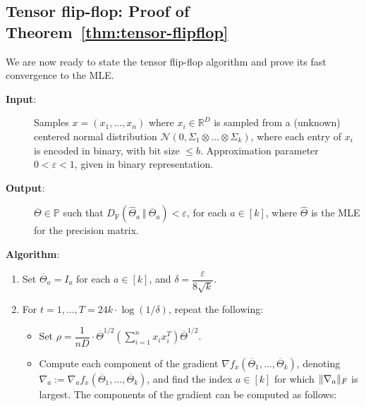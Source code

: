 \documentclass[aos]{imsart}
\theoremstyle{definition}
\numberwithin{equation}{section}
\DeclarePairedDelimiter{\norm}{\lVert}{\rVert}
\newcommand{\R}{{\mathbb{R}}}
\newcommand{\otheta}{\overline{\Theta}}
\newcommand{\htheta}{\widehat{\Theta}}
\newcommand{\ot}{\otimes}
\newcommand{\eps}{\varepsilon}
\newcommand{\cN}{\mathcal{N}}
\newcommand{\SPD}{\mathbb{P}}
\newcommand{\samp}{x}
\newcommand{\DF}{D_{\operatorname{F}}}
\begin{document}
\subsection{Tensor flip-flop: Proof of Theorem~\ref{thm:tensor-flipflop}}

We are now ready to state the tensor flip-flop algorithm and prove its fast convergence to the MLE.

\begin{Algorithm}
\begin{description}
\item[\hspace{.2cm}\textbf{Input}:] Samples $\samp = (\samp_1, \ldots, \samp_n)$ where $\samp_i \in \R^D$ is sampled from a (unknown) centered normal distribution $\cN(0, \Sigma_1 \ot \dots \ot \Sigma_k)$, where each entry of $\samp_i$ is encoded in binary, with bit size $\le b$. Approximation parameter $0 < \eps < 1$, given in binary representation. \\[.3ex]

\item[\hspace{.2cm}\textbf{Output}:] $\otheta \in \SPD$ such that $\DF(\htheta_a \ \Vert  \ \otheta_a) < \eps$, for each $a \in [k]$, where $\htheta$ is the MLE for the precision matrix. \\[.3ex]

\item[\hspace{.2cm}\textbf{Algorithm}:]
\end{description}
\begin{enumerate}
\item\label{it:tensor-flip-flop step 1} Set $\otheta_a = I_a$ for each $a \in [k]$, and
$\delta = \dfrac{\eps}{8 \sqrt{k}}$.

\vspace{5pt}
\item\label{it:tensor-flip-flop step 2} For $t=1,\dots,T = 24 k \cdot \log(1/\delta)$, repeat the following:

\vspace{5pt}

\begin{itemize}
\item Set $\rho = \dfrac{1}{nD} \cdot \otheta^{1/2} \left( \sum_{i=1}^n x_ix_i^T \right) \otheta^{1/2}.$

\item Compute each component of the gradient $\nabla f_{\samp}(\otheta_1, \ldots, \otheta_k)$, denoting $\nabla_a := \nabla_a f_{\samp}(\otheta_1, \ldots, \otheta_k)$, and find the index $a \in [k]$ for which $\norm{\nabla_a}_F$ is largest.
The components of the gradient can be computed as follows:


\end{itemize}
\end{enumerate}
\end{Algorithm}
\end{document}

